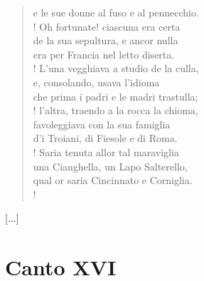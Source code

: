 \documentclass[a4paper, twoside, titlepage]{book}
\newcounter{mar}
\newcommand{\salt}{\hspace{1em}[...]}
\begin{document}
\begin{verse}
e le sue donne al fuso e al pennecchio.\\!
Oh fortunate! ciascuna era certa\\
de la sua sepultura, e ancor nulla\\
era per Francia nel letto diserta.\\!
L’una vegghiava a studio de la culla,\\
e, consolando, usava l’idioma\\
che prima i padri e le madri trastulla;\\!
l’altra, traendo a la rocca la chioma,\\
favoleggiava con la sua famiglia\\
d’i Troiani, di Fiesole e di Roma.\\!
Saria tenuta allor tal maraviglia\\
una Cianghella, un Lapo Salterello,\\
qual or saria Cincinnato e Corniglia.\\!
\end{verse}

\salt

\chapter{Canto XVI}
\end{document}
